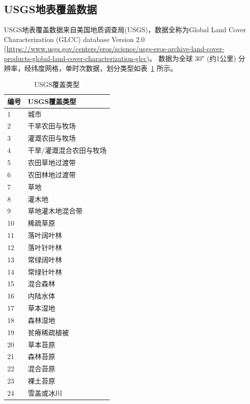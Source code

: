 \subsection{USGS地表覆盖数据}\label{USGS地表覆盖数据}
USGS地表覆盖数据来自美国地质调查局(USGS)，数据全称为Global Land Cover Characterization (GLCC) database Version 2.0 
(\url{https://www.usgs.gov/centers/eros/science/usgs-eros-archive-land-cover-products-global-land-cover-characterization-glcc})。
数据为全球 \ang{;;30} (约1公里) 分辨率，经纬度网格，单时次数据，划分类型如表~\ref{tab:USGS覆盖类型} 所示。
\begin{table}[htbp]
\centering
\caption{USGS覆盖类型}
\label{tab:USGS覆盖类型}
\begin{tabular}{@{}ll@{}}
\toprule
编号 & USGS覆盖类型     \\ \midrule
1  & 城市           \\
2  & 干旱农田与牧场      \\
3  & 灌溉农田与牧场      \\
4  & 干旱/灌溉混合农田与牧场 \\
5  & 农田草地过渡带      \\
6  & 农田林地过渡带      \\
7  & 草地           \\
8  & 灌木地          \\
9  & 草地灌木地混合带     \\
10 & 稀疏草原         \\
11 & 落叶阔叶林        \\
12 & 落叶针叶林        \\
13 & 常绿阔叶林        \\
14 & 常绿针叶林        \\
15 & 混合森林         \\
16 & 内陆水体         \\
17 & 草本湿地         \\
18 & 森林湿地         \\
19 & 贫瘠稀疏植被       \\
20 & 草本苔原         \\
21 & 森林苔原         \\
22 & 混合苔原         \\
23 & 裸土苔原         \\
24 & 雪盖或冰川        \\ \bottomrule
\end{tabular}
\end{table}


